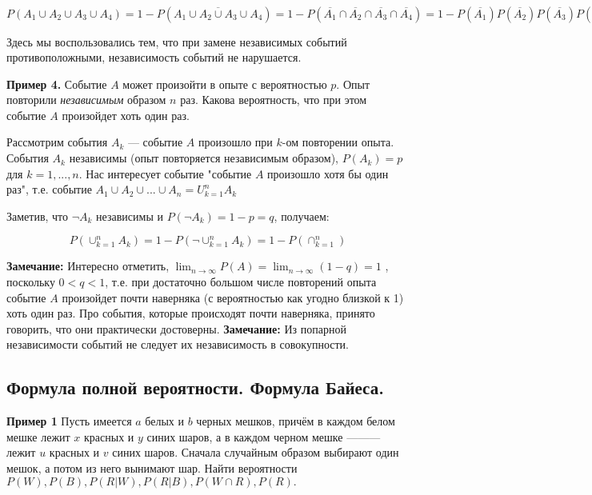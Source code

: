 \documentclass{article}
\begin{document}
    \( P(A_1 \cup A_2 \cup A_3 \cup A_4) = 1 - P(\overline{A_1 \cup A_2 \cup A_3 \cup A_4}) = 1 - P(\overline{A_1} \cap \overline{A_2} \cap \overline{A_3} \cap \overline{A_4}) = 1 - P(\overline{A_1})P(\overline{A_2})P(\overline{A_3})P(\overline{A_4}) = 1 - (\frac{1}{3})^4 = \frac{80}{81} \approx 0,988 \)

    Здесь мы воспользовались тем, что при замене независимых событий противоположными, независимость событий не нарушается.


    \textbf{Пример 4.} Событие $A$ может произойти в опыте с вероятностью $p$. Опыт повторили \textit{независимым} образом $n$ раз. Какова вероятность, что при этом событие $A$ произойдет хоть один раз.

    Рассмотрим события \(A_k\) — событие $A$ произошло при $k$-ом повторении опыта. События \(A_k\) независимы (опыт повторяется независимым образом),
    \(P(A_k) = p\) для \(k = 1,..., n.\)
    Нас интересует событие "событие $A$ произошло хотя бы один раз", т.е. событие \(A_1 \cup A_2 \cup ... \cup A_n = U^n_{k = 1}A_k\)

    Заметив, что \(\lnot A_k\) независимы и \(P(\lnot A_k) = 1 - p = q\), получаем:

    \[P(\cup_{k=1}^{n} A_k) = 1 - P(\lnot \cup_{k=1}^{n} A_k) = 1 - P(\cap_{k=1}^{n} )\]

    \textbf{Замечание:} Интересно отметить, \( \lim_{n \to \infty} P(A) = \lim_{n \to \infty}(1 - q)= 1\) , поскольку \(0<q<1\), т.е. при достаточно большом числе повторений опыта событие $A$ произойдет почти наверняка (с вероятностью как угодно близкой к 1) хоть один раз. Про события, которые происходят почти наверняка, принято говорить, что они практически достоверны.
    \textbf{Замечание:} Из попарной независимости событий не следует их независимость в совокупности. 



    \subsection{Формула полной вероятности. Формула Байеса.}

    \textbf{Пример 1}
    Пусть имеется $a$ белых и $b$ черных мешков, причём в каждом белом мешке лежит $x$ красных и $y$ синих шаров, 
    а в каждом черном мешке ——— лежит $u$ красных и $v$ синих шаров. 
    Сначала случайным образом выбирают один мешок, 
    а потом из него вынимают шар. Найти вероятности \(P(W), P(B), P(R|W), P(R|B), P(W \cap R), P(R).\)
\end{document}
